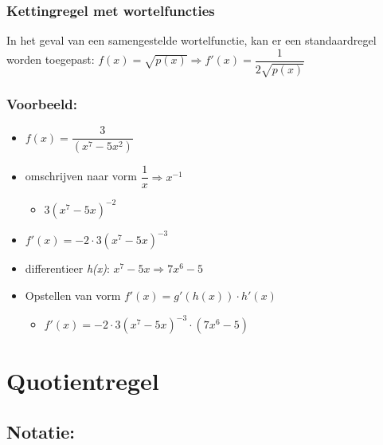 \documentclass[11pt]{article}
\begin{document}
\subsubsection{Kettingregel met wortelfuncties}
\label{sec:orgdf0d884}
In het geval van een samengestelde wortelfunctie, kan er een standaardregel worden toegepast:
\(f(x) = \sqrt{p(x)} \Rightarrow f'(x) = \dfrac{1}{2\sqrt{p(x)}}\)
\subsubsection{Voorbeeld:}
\label{sec:orge4668c5}
\begin{itemize}
\item \(f(x) = \dfrac{3}{(x^{7}-5x^{2})}\)
\item omschrijven naar vorm \(\dfrac{1}{x} \Rightarrow x^{-1}\)
\begin{itemize}
\item \(3(x^{7}-5x)^{-2}\)
\end{itemize}
\item \(f'(x) = -2 \cdot 3(x^{7}-5x)^{-3}\)
\item differentieer \textit{h(x)}: \(x^{7}-5x \Rightarrow 7x^{6}-5\)
\item Opstellen van vorm \(f'(x) = g'(h(x)) \cdot h'(x)\)
\begin{itemize}
\item \(f'(x) = -2 \cdot 3(x^{7}-5x)^{-3} \cdot (7x^{6}-5)\)
\end{itemize}
\end{itemize}






\section{Quotientregel}
\label{sec:orgfe461bd}
\subsection{Notatie:}
\label{sec:org880cea3}
\end{document}

